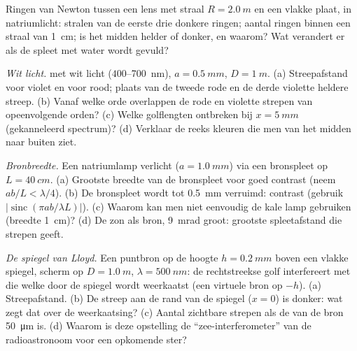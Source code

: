 \begin{exercise}[$\star$]\label{exo:b2:two-wave-interference:4}
Ringen van Newton tussen een lens met straal $R = \qty{2.0}{m}$ en een
vlakke plaat, in
natriumlicht: stralen van de eerste drie donkere ringen; aantal ringen
binnen een straal van \qty{1}{cm}; is het midden helder of donker, en waarom?
Wat verandert er als de spleet met water wordt gevuld?
\end{exercise}

\begin{exercise}[$\star\star$]\label{exo:b2:two-wave-interference:5}
\emph{Wit licht.}  met wit licht ($400$--\qty{700}{nm}),
$a = \qty{0.5}{mm}$, $D = \qty{1}{m}$. (a) Streepafstand voor violet en voor rood;
plaats van de tweede rode en de derde violette heldere streep. (b)
Vanaf welke orde overlappen de rode en violette strepen van opeenvolgende
orden? (c) Welke golflengten ontbreken bij $x = \qty{5}{mm}$
(gekanneleerd spectrum)? (d) Verklaar de reeks kleuren die men van
het midden naar buiten ziet.
\end{exercise}

\begin{exercise}[$\star\star$]\label{exo:b2:two-wave-interference:6}
\emph{Bronbreedte.} Een natriumlamp verlicht  ($a = \qty{1.0}{mm}$)
via een bronspleet op $L = \qty{40}{cm}$. (a) Grootste breedte van de
bronspleet voor goed contrast (neem $ab/L < \lambda/4$). (b) De bronspleet
wordt tot \qty{0.5}{mm} verruimd: contrast (gebruik
$|\operatorname{sinc}(\pi ab/\lambda L)|$).
(c) Waarom kan men niet eenvoudig de kale lamp gebruiken (breedte
\qty{1}{cm})? (d) De
zon als bron, \qty{9}{mrad} groot: grootste spleetafstand die
strepen geeft.
\end{exercise}

\begin{exercise}[$\star\star$]\label{exo:b2:two-wave-interference:7}
\emph{De spiegel van Lloyd.} Een puntbron op de hoogte $h = \qty{0.2}{mm}$ boven een
vlakke spiegel, scherm op $D = \qty{1.0}{m}$, $\lambda = \qty{500}{nm}$: de
rechtstreekse golf
interfereert met die welke door de spiegel wordt weerkaatst (een virtuele bron op
$-h$). (a) Streepafstand. (b) De streep aan de rand van de spiegel ($x = 0$) is
donker: wat zegt dat over de weerkaatsing? (c) Aantal zichtbare strepen
als de  van de bron \qty{50}{\micro m} is. (d) Waarom is
deze opstelling de ``zee-interferometer'' van de radioastronoom voor een
opkomende ster?
\end{exercise}

